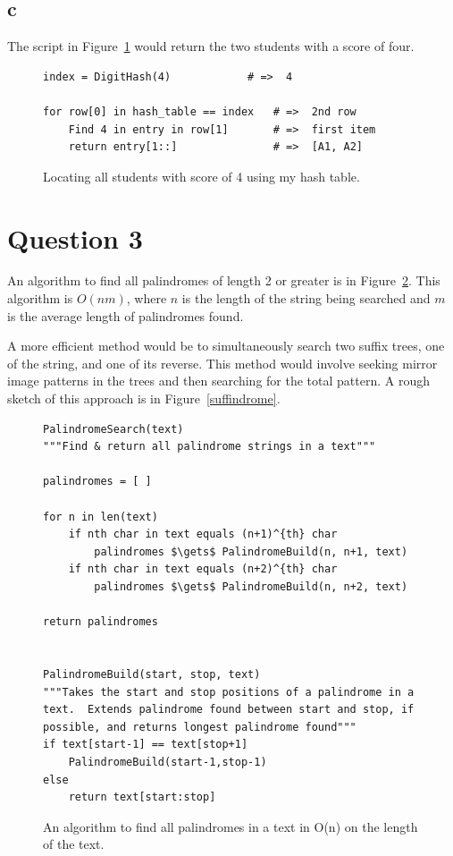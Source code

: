 \documentclass[12pt]{article}
\begin{document}
\subsection*{c} The script in Figure~\ref{script} would return the two students with a score of four. 
\begin{figure}[h]
\centering
\begin{framed}
\begin{lstlisting}
index = DigitHash(4)   			# =>  4

for row[0] in hash_table == index  	# =>  2nd row
	Find 4 in entry in row[1]		# =>  first item
	return entry[1::]				# =>  [A1, A2]
\end{lstlisting}
\end{framed}
\caption{Locating all students with score of 4 using my hash table.}
\label{script}
\end{figure}

\clearpage
\section*{Question 3}  An algorithm to find all palindromes of length 2 or greater is in Figure~\ref{palindromes}.  This algorithm is $O(nm)$, where $n$ is the length of the string being searched and $m$ is the average length of palindromes found.

A more efficient method would be to simultaneously search two suffix trees, one of the string, and one of its reverse.  This method would involve seeking mirror image patterns in the trees and then searching for the total pattern.  A rough sketch of this approach is in Figure~\ref{suffindrome}.

\begin{figure}[h]
\centering
\begin{framed}
\begin{lstlisting}
PalindromeSearch(text)
"""Find & return all palindrome strings in a text"""

palindromes = [ ]

for n in len(text)
	if nth char in text equals (n+1)^{th} char
		palindromes $\gets$ PalindromeBuild(n, n+1, text)
	if nth char in text equals (n+2)^{th} char
		palindromes $\gets$ PalindromeBuild(n, n+2, text)

return palindromes


PalindromeBuild(start, stop, text)
"""Takes the start and stop positions of a palindrome in a text.  Extends palindrome found between start and stop, if possible, and returns longest palindrome found"""
if text[start-1] == text[stop+1]
	PalindromeBuild(start-1,stop-1)
else 
	return text[start:stop]
\end{lstlisting}
\end{framed}
\caption{An algorithm to find all palindromes in a text in O(n) on the length of the text.}
\label{palindromes}
\end{figure}
\end{document}
